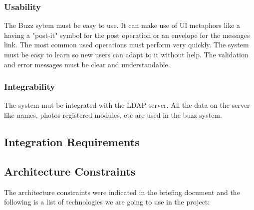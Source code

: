\documentclass[12pt]{article}
\begin{document}
\subsubsection{Usability}
The Buzz sytem must be easy to use. It can make use of UI metaphors like a having a "post-it" symbol for the post operation or an envelope for the messages link.
The most common used operations must perform very quickly. The system must be easy to learn so new users can adapt to it without help. 
The validation and error messages must be clear and understandable.
\subsubsection{Integrability} 
The system mut be integrated with the LDAP server. 
All the data on the server like names, photos registered modules, etc are used in the buzz system. 

\subsection{Integration Requirements}
\subsection{Architecture Constraints}

The architecture constraints were indicated in the briefing document and the following is a list of technologies we are going to use in the project:
\end{document}

